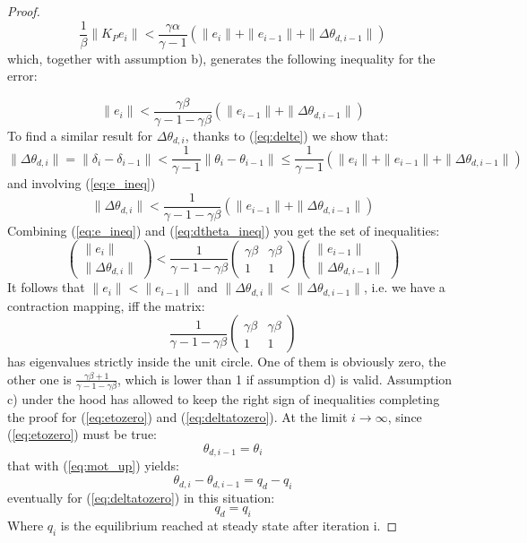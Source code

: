 \begin{proof}
\[
    \frac{1}{\beta} \|K_P e_i \| <  
    \frac{\gamma\alpha}{\gamma-1}(\|e_i \|+ \|e_{i-1}\| + \|\Delta\theta_{d,i-1}\|)
\]
which, together with assumption b), generates the following inequality for the error: 

\begin{equation} \label{eq:e_ineq}
    \|e_i\| < \frac{\gamma\beta}{\gamma-1-\gamma\beta}(\|e_{i-1}\|+\|\Delta\theta_{d,i-1}\|)
\end{equation}
To find a similar result for \(\Delta\theta_{d,i}\), thanks to (\ref{eq:delte}) we show that:
\[
 \|\Delta\theta_{d,i}\| = \|\delta_i - \delta_{i-1}\| < \frac{1}{\gamma-1}\|\theta_i-\theta_{i-1}\| \leq \frac{1}{\gamma-1}(\|e_i \|+ \|e_{i-1}\| + \|\Delta\theta_{d,i-1}\|)
\]
and involving (\ref{eq:e_ineq})
\begin{equation} \label{eq:dtheta_ineq}
    \|\Delta\theta_{d,i}\|  <\frac{1}{\gamma-1-\gamma\beta}(\|e_{i-1}\|+\|\Delta\theta_{d,i-1}\|)
\end{equation}
Combining (\ref{eq:e_ineq}) and (\ref{eq:dtheta_ineq}) you get the set of inequalities:
\begin{equation}
    \begin{pmatrix}\|e_i\|\\ \|\Delta\theta_{d,i}\|\end{pmatrix} < \frac{1}{\gamma-1-\gamma\beta}\begin{pmatrix}\gamma\beta & \gamma\beta \\ 1 & 1\end{pmatrix}\begin{pmatrix}\|e_{i-1}\|\\ \|\Delta\theta_{d,i-1}\|\end{pmatrix}
\end{equation}
It follows that \( \|e_i\| < \|e_{i-1}\| \) and \( \|\Delta\theta_{d,i}\|<\|\Delta\theta_{d,i-1}\|\), i.e. we have a contraction mapping, iff the matrix:
\[
    \frac{1}{\gamma-1-\gamma\beta}\begin{pmatrix}\gamma\beta & \gamma\beta \\ 1 & 1\end{pmatrix}
\]
has eigenvalues strictly inside the unit circle. One of them is obviously zero, the other one is \( \frac{\gamma\beta +1}{\gamma-1-\gamma\beta}\), which is lower than 1 if assumption d) is valid. Assumption c) under the hood has allowed to keep the right sign of inequalities completing the proof for (\ref{eq:etozero}) and (\ref{eq:deltatozero}). 
At the limit \(i\to\infty\), since (\ref{eq:etozero}) must be true:
\begin{equation*}
    \theta_{d,i-1}=\theta_i
\end{equation*}
that with (\ref{eq:mot_up}) yields:
\begin{equation*}
    \theta_{d,i} - \theta_{d,i-1} = q_d - q_i
\end{equation*}
eventually for (\ref{eq:deltatozero}) in this situation:
\begin{equation}
    q_d = q_i
\end{equation}
Where \(q_i\) is the equilibrium reached at steady state after iteration i. \end{proof}
